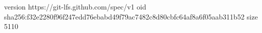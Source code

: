 version https://git-lfs.github.com/spec/v1
oid sha256:f32e2280f96f247edd76ebabd49f79ac7482c8d80cbfc64af8a6f05aab311b52
size 5110

